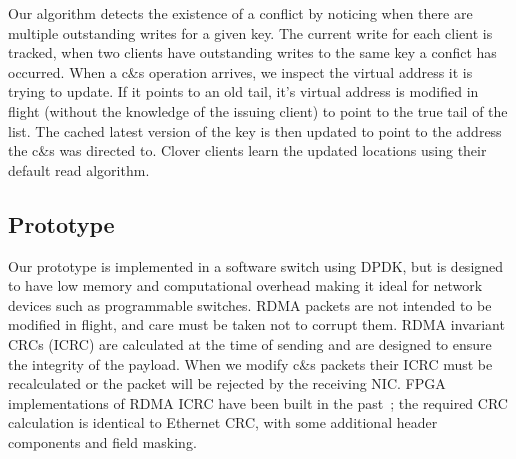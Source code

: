   Our algorithm detects the existence of a conflict by noticing when there
  are multiple outstanding writes for a given key. The current write for each
  client is tracked, when two clients have outstanding writes to the same key
  a confict has occurred. When a c\&s operation arrives, we inspect the virtual
  address it is trying to update. If it points to an old tail, it's virtual
  address is modified in flight (without the knowledge of the issuing client)
  to point to the true tail of the list. The cached latest version of the key
  is then updated to point to the address the c\&s was directed to. Clover
  clients learn the updated locations using their default read algorithm.

\subsection{Prototype}

Our prototype is implemented in a software switch using DPDK, but is
designed to have low memory and computational overhead making it ideal
for network devices such as programmable switches.  RDMA packets are
not intended to be modified in flight, and care must be taken not to
corrupt them. RDMA invariant CRCs (ICRC) are calculated at the time of
sending and are designed to ensure the integrity of the payload. When
we modify c\&s packets their ICRC must be recalculated or the packet
will be rejected by the receiving NIC. FPGA implementations of RDMA
ICRC have been built in the past~\cite{Mansour_2019}; the required CRC
calculation is identical to Ethernet CRC, with some additional header
components and field masking.


